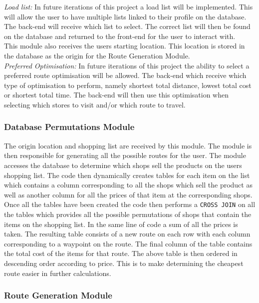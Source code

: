 \documentclass[10pt,twocolumn]{witseiepaper}
\begin{document}
		\textit{Load list:} In future iterations of this project a load list will be implemented. This will allow the user to have multiple lists linked to their profile on the database. The back-end will receive which list to select. The correct list will then be found on the database and returned to the front-end for the user to interact with. \\
		
		This module also receives the users starting location. This location is stored in the database as the origin for the Route Generation Module.\\
		
		\textit{Preferred Optimisation:} In future iterations of this project the ability to select a preferred route optimisation will be allowed. The back-end which receive which type of optimisation to perform, namely shortest total distance, lowest total cost or shortest total time. The back-end will then use this optimisation when selecting which stores to visit and/or which route to travel.
		
		\subsubsection{Database Permutations Module}
		
		The origin location and shopping list are received by this module. The module is then responsible for generating all the possible routes for the user. The module accesses the database to determine which shops sell the products on the users shopping list. The code then dynamically creates tables for each item on the list which contains a column corresponding to all the shops which sell the product as well as another column for all the prices of that item at the corresponding shops. \\
		
		Once all the tables have been created the code then performs a \texttt{CROSS JOIN} on all the tables which provides all the possible permutations of shops that contain the items on the shopping list. In the same line of code a sum of all the prices is taken. The resulting table consists of a new route on each row with each column corresponding to a waypoint on the route. The final column of the table contains the total cost of the items for that route. The above table is then ordered in descending order according to price. This is to make determining the cheapest route easier in further calculations.
		
		\subsubsection{Route Generation Module}
		
\end{document}
